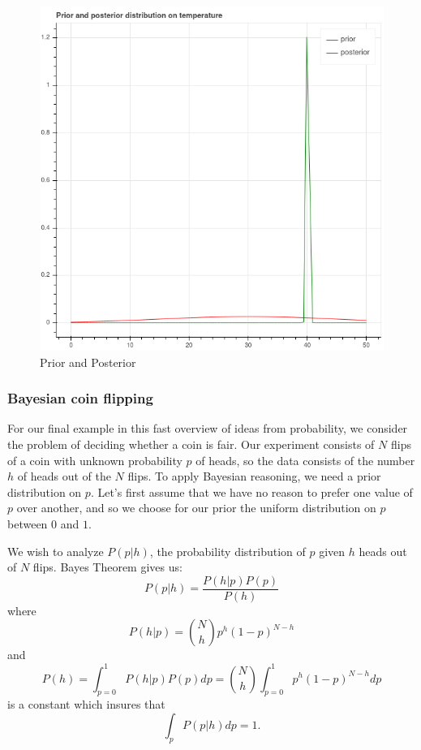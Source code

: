 \documentclass[
]{article}
\begin{document}
\begin{figure}
\hypertarget{fig:comparison}{%
\centering
\includegraphics{../img/priorposterior.png}
\caption{Prior and Posterior}\label{fig:comparison}
}
\end{figure}

\hypertarget{bayesian-coin-flipping}{%
\subsubsection{Bayesian coin flipping}\label{bayesian-coin-flipping}}

For our final example in this fast overview of ideas from probability,
we consider the problem of deciding whether a coin is fair. Our
experiment consists of \(N\) flips of a coin with unknown probability
\(p\) of heads, so the data consists of the number \(h\) of heads out of
the \(N\) flips. To apply Bayesian reasoning, we need a prior
distribution on \(p\). Let's first assume that we have no reason to
prefer one value of \(p\) over another, and so we choose for our prior
the uniform distribution on \(p\) between \(0\) and \(1\).

We wish to analyze \(P(p|h)\), the probability distribution of \(p\)
given \(h\) heads out of \(N\) flips. Bayes Theorem gives us: \[
P(p|h) = \frac{P(h|p)P(p)}{P(h)}
\] where \[
P(h|p) = \binom{N}{h}p^{h}(1-p)^{N-h}
\] and \[
P(h)=\int_{p=0}^{1} P(h|p)P(p) dp = \binom{N}{h}\int_{p=0}^{1} p^{h}(1-p)^{N-h}dp
\] is a constant which insures that \[\int_{p}P(p|h)dp=1.\]
\end{document}
